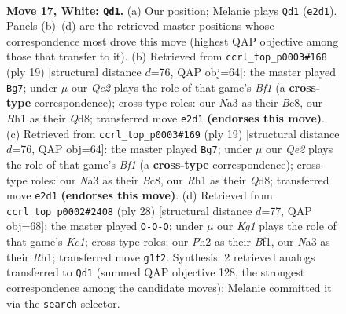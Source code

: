\documentclass[11pt]{article}
\begin{document}
\clearpage

\begin{figure}[p]\centering
\begin{subfigure}{0.46\textwidth}\centering
\resizebox{\linewidth}{!}{%
\newchessgame
\chessboard[
  setfen={r1b1kbnr/4q3/6p1/p1p1Pp2/3p1P1p/NP6/P3Q1PP/R1B2BKR w kq - 0 17},
  showmover=false,
  pgfstyle=straightmove, color=movearrow, markmove={e2-d1}
]}
\caption{}
\end{subfigure}\hfill
\begin{subfigure}{0.46\textwidth}\centering
\resizebox{\linewidth}{!}{%
\newchessgame
\chessboard[
  setfen={rnbqkb1r/pp2pp2/1n1p3p/7P/2PP1B2/2N5/PP4P1/R2QKBNR b KQkq - 0 10},
  showmover=false,
  pgfstyle=straightmove, color=movearrow, markmove={f8-g7}
]}
\caption{}
\end{subfigure}
\\[4pt]
\begin{subfigure}{0.46\textwidth}\centering
\resizebox{\linewidth}{!}{%
\newchessgame
\chessboard[
  setfen={rnbqkb1r/pp2pp2/1n1p3p/7P/2PP1B2/2N5/PP4P1/R2QKBNR b KQkq - 0 10},
  showmover=false,
  pgfstyle=straightmove, color=movearrow, markmove={f8-g7}
]}
\caption{}
\end{subfigure}\hfill
\begin{subfigure}{0.46\textwidth}\centering
\resizebox{\linewidth}{!}{%
\newchessgame
\chessboard[
  setfen={r3kb1r/ppp1qpp1/8/4Pb1p/2P5/4Q2P/PP1N1PP1/R3KB1R w KQkq - 1 15},
  showmover=false,
  pgfstyle=straightmove, color=movearrow, markmove={e1-c1}
]}
\caption{}
\end{subfigure}
\caption{\textbf{Move 17, White: \texttt{Qd1}.} (a) Our position; Melanie plays \texttt{Qd1} (\texttt{e2d1}). Panels (b)--(d) are the retrieved master positions whose correspondence most drove this move (highest QAP objective among those that transfer to it). (b) Retrieved from \texttt{ccrl\_top\_p0003\#168} (ply 19) [structural distance $d$=76, QAP obj=64]: the master played \texttt{Bg7}; under $\mu$ our \emph{Qe2} plays the role of that game's \emph{Bf1} (a \textbf{cross-type} correspondence); cross-type roles: our \emph{N}a3 as their \emph{B}c8, our \emph{R}h1 as their \emph{Q}d8; transferred move \texttt{e2d1} \textbf{(endorses this move)}. (c) Retrieved from \texttt{ccrl\_top\_p0003\#169} (ply 19) [structural distance $d$=76, QAP obj=64]: the master played \texttt{Bg7}; under $\mu$ our \emph{Qe2} plays the role of that game's \emph{Bf1} (a \textbf{cross-type} correspondence); cross-type roles: our \emph{N}a3 as their \emph{B}c8, our \emph{R}h1 as their \emph{Q}d8; transferred move \texttt{e2d1} \textbf{(endorses this move)}. (d) Retrieved from \texttt{ccrl\_top\_p0002\#2408} (ply 28) [structural distance $d$=77, QAP obj=68]: the master played \texttt{O-O-O}; under $\mu$ our \emph{Kg1} plays the role of that game's \emph{Ke1}; cross-type roles: our \emph{P}h2 as their \emph{B}f1, our \emph{N}a3 as their \emph{R}h1; transferred move \texttt{g1f2}. Synthesis: 2 retrieved analogs transferred to \texttt{Qd1} (summed QAP objective 128, the strongest correspondence among the candidate moves); Melanie committed it via the \texttt{search} selector.}
\label{fig:thought-m32}
\end{figure}
\end{document}
